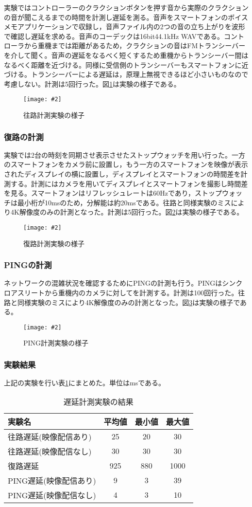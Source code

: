\documentclass[a4paper,12pt]{jsarticle}
\newcommand{\figuref}[1]{図\ref{#1}}
\newcommand{\tabref}[1]{表\ref{#1}}
\newcommand{\fig}[4][width=\textwidth]{
    \begin{figure}[!h]
    \begin{center}
    \texttt{[image: \#2]}
    \caption{#3}
    \label{#4}
    \vspace*{-1cm}
    \end{center}
    \end{figure}
}
\begin{document}
実験ではコントローラーのクラクションボタンを押す音から実際のクラクションの音が聞こえるまでの時間を計測し遅延を測る。音声をスマートフォンのボイスメモアプリケーションで収録し，音声ファイル内の2つの音の立ち上がりを波形で確認し遅延を求める。音声のコーデックは16bit44.1kHz WAVである。コントローラから重機までは距離があるため，クラクションの音はFMトランシーバーを介して聞く。音声の遅延をなるべく短くするため重機からトランシーバー間はなるべく距離を近づける。同様に受信側のトランシーバーもスマートフォンに近づける。トランシーバーによる遅延は，原理上無視できるほど小さいものなので考慮しない。計測は5回行った。\figuref{test_tx}は実験の様子である。
\clearpage
\fig[width=7cm]{image/test_tx.jpg}{往路計測実験の様子}{test_tx}

\subsubsection{復路の計測}
実験では2台の時刻を同期させ表示させたストップウォッチを用い行った。一方のスマートフォンをカメラ前に設置し，もう一方のスマートフォンを映像が表示されたディスプレイの横に設置し，ディスプレイとスマートフォンの時間差を計測する。計測にはカメラを用いてディスプレイとスマートフォンを撮影し時間差を見る。スマートフォンはリフレッシュレートは60Hzであり，ストップウォッチは最小桁が10msのため，分解能は約20msである。往路と同様実験のミスにより4K解像度のみの計測となった。計測は5回行った。\figuref{test_rx}は実験の様子である。
\fig[width=7cm]{image/test_rx.jpg}{復路計測実験の様子}{test_rx}
\clearpage

\subsubsection{PINGの計測}
ネットワークの混雑状況を確認するためにPINGの計測も行う。PINGはシンクロアスリートから重機内のカメラに対してを計測する。計測は100回行った。往路と同様実験のミスにより4K解像度のみの計測となった。\figuref{test_ping}は実験の様子である。
\fig[width=7cm]{image/test_ping.jpg}{PING計測実験の様子}{test_ping}

\subsubsection{実験結果}
上記の実験を行い\tabref{test_table}にまとめた。単位はmsである。

\begin{table}[htb]
\begin{center}
\begin{tabular}{l|c|c|c}
実験名 & 平均値 & 最小値 & 最大値 \\ \hline
往路遅延(映像配信あり) & 25 & 20 & 30 \\
往路遅延(映像配信なし) & 30 & 30 & 30 \\
復路遅延 & 925 & 880 & 1000 \\
PING遅延(映像配信あり) & 9 & 3 & 39 \\
PING遅延(映像配信なし) & 4 & 3 & 10 \\
\end{tabular}
\caption{遅延計測実験の結果}
\label{test_table}
\end{center}
\end{table}
\end{document}
